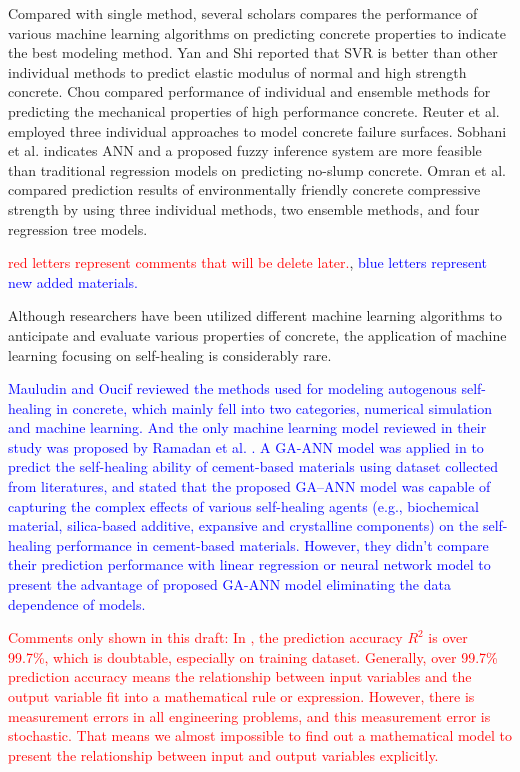 \documentclass[11pt]{article}
\begin{document}
	Compared with single method, several scholars compares the performance of various machine learning algorithms on predicting concrete properties to indicate the best modeling method. Yan and Shi \cite{yan2010prediction} reported that SVR is better than other individual methods to predict elastic modulus of normal and high strength concrete. Chou \cite{chou2014machine} compared performance of individual and ensemble methods for predicting the mechanical properties of high performance concrete. Reuter et al. \cite{reuter2018comparative} employed three individual approaches to model concrete failure surfaces.  Sobhani et al. \cite{sobhani2010prediction} indicates ANN and a proposed fuzzy inference system are more feasible than traditional regression models on predicting no-slump concrete. Omran et al. \cite{omran2016comparison} compared prediction results of environmentally friendly concrete compressive strength by using three individual methods, two ensemble methods, and four regression tree models.
	
	\textcolor{red}{red letters represent comments that will be delete later.}, \textcolor{blue}{blue letters represent new added materials.}
	
	Although researchers have been utilized different machine learning algorithms to anticipate and evaluate various properties of concrete, the application of machine learning focusing on self-healing is considerably rare. 
	
	\textcolor{blue}{
		Mauludin and Oucif \cite{mauludin2019modeling} reviewed the methods used for modeling autogenous self-healing in concrete, which mainly fell into two categories, numerical simulation and machine learning. And the only machine learning model reviewed in their study was proposed by Ramadan et al. \cite{ramadan2017modeling}. A GA-ANN model was applied in \cite{ramadan2017modeling} to predict the self-healing ability of cement-based materials using dataset collected from literatures, and stated that the proposed GA–ANN model was capable of capturing the complex effects of various self-healing agents (e.g., biochemical material, silica-based additive, expansive and crystalline components) on the self-healing performance in cement-based materials. However, they didn't compare their prediction performance with linear regression or neural network model to present the advantage of proposed GA-ANN model eliminating the data dependence of models.}  
		
		
		\textcolor{red}{Comments only shown in this draft: In \cite{ramadan2017modeling}, the prediction accuracy $R^2$ is over 99.7\%, which is doubtable, especially on training dataset. Generally, over 99.7\% prediction accuracy means the relationship between input variables and the output variable fit into a mathematical rule or expression. However, there is measurement errors in all engineering problems, and this measurement error is stochastic. That means we almost impossible to find out a mathematical model to present the relationship between input and output variables explicitly.}
	
\end{document}

